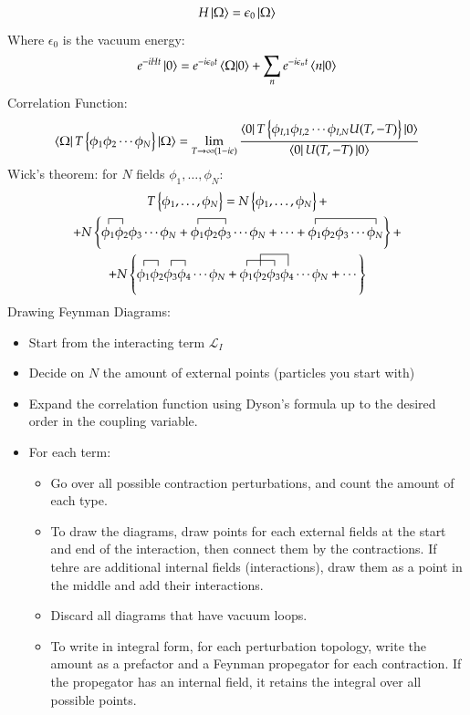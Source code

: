 \documentclass{article}
\begin{document}
\begin{equation*}
    H \ket{\Omega} = \epsilon_0 \ket{\Omega}
\end{equation*}
Where $\epsilon_0$ is the vacuum energy:
\begin{equation*}
    e^{-iHt}\ket{0} = e^{-i\epsilon_0t}\braket{\Omega}{0} + \sum_n e^{-i\epsilon_nt}\braket{n}{0}
\end{equation*}
Correlation Function:
\begin{equation*}
    \bra{\Omega}T\left\{\phi_1 \phi_2 \cdots \phi_N\right\}\ket{\Omega} = \lim_{T \rightarrow \infty(1 - i\epsilon)} \frac{\bra{0}T\left\{\phi_{I,1}\phi_{I,2}\cdots\phi_{I,N}U(T, -T)\right\}\ket{0}}{\bra{0}U(T, -T)\ket{0}}
\end{equation*}
Wick's theorem: for $N$ fields $\phi_1,\dots,\phi_N$:
\begin{equation*}
\begin{gathered}
    T\left\{\phi_1,\dots,\phi_N\right\} =
    N\left\{\phi_1,\dots,\phi_N\right\} + \\ +
    N\left\{\contraction{}{\phi_1}{}{\phi_2}\phi_1\phi_2\phi_3\cdots\phi_N + \contraction{}{\phi_1}{\phi_2}{\phi_3}\phi_1\phi_2\phi_3\cdots\phi_N + \cdots + \contraction{}{\phi_1}{\phi_2\phi_3\cdots}{\phi_N}\phi_1\phi_2\phi_3\cdots\phi_N\right\} + \\ +
    N\left\{\contraction{}{\phi_1}{}{\phi_2}\contraction{\phi_1\phi_2}{\phi_3}{}{\phi_4}\phi_1\phi_2\phi_3\phi_4\cdots\phi_N + \contraction{}{\phi_1}{\phi_2}{\phi_3}\contraction[2ex]{\phi_1}{\phi_2}{\phi_3}{\phi_4}\phi_1\phi_2\phi_3\phi_4\cdots\phi_N + \cdots\right\}
\end{gathered}
\end{equation*}
Drawing Feynman Diagrams:
\begin{itemize}
    \item Start from the interacting term $\mathcal{L}_I$
    \item Decide on $N$ the amount of external points (particles you start with)
    \item Expand the correlation function using Dyson's formula up to the desired order in the coupling variable.
    \item For each term: 
    \begin{itemize}
        \item Go over all possible contraction perturbations, and count the amount of each type.
        \item To draw the diagrams, draw points for each external fields at the start and end of the interaction, then connect them by the contractions. If tehre are additional internal fields (interactions), draw them as a point in the middle and add their interactions.
        \item Discard all diagrams that have vacuum loops.
        \item To write in integral form, for each perturbation topology, write the amount as a prefactor and a Feynman propegator for each contraction. If the propegator has an internal field, it retains the integral over all possible points.
    \end{itemize}
\end{itemize}
\end{document}
